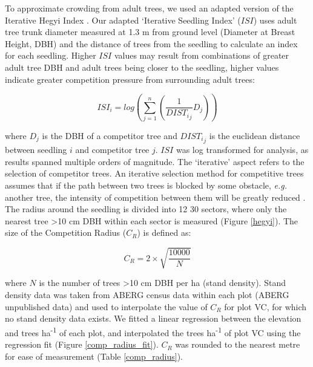 \documentclass[a4paper, 11pt]{article}
\newcommand{\textapprox}{\raisebox{0.5ex}{\texttildelow}}
\begin{document}
To approximate crowding from adult trees, we used an adapted version of the Iterative Hegyi Index \citep{Hegyi1974, Lee2004, Seifert2014}. Our adapted `Iterative Seedling Index' ($ISI$) uses adult tree trunk diameter measured at \textapprox{}1.3 m from ground level (Diameter at Breast Height, DBH) and the distance of trees from the seedling to calculate an index for each seedling. Higher $ISI$ values may result from combinations of  greater adult tree DBH and adult trees being closer to the seedling, higher values indicate greater competition pressure from surrounding adult trees:

\begin{equation}
\label{eq:ISI}
ISI_i = log(\sum_{j=1}^n (\frac{1}{{DIST_i}_j} D_j))
\end{equation}

where $D_j$ is the DBH of a competitor tree and ${{DIST_i}_j}$ is the euclidean distance between seedling $i$ and competitor tree $j$. $ISI$ was log transformed for analysis, as results spanned multiple orders of magnitude. The `iterative' aspect refers to the selection of competitor trees. An iterative selection method for competitive trees assumes that if the path between two trees is blocked by some obstacle, \textit{e.g.} another tree, the intensity of competition between them will be greatly reduced \citep{Gadow1999}. The radius around the seedling is divided into 12 30\textdegree{} sectors, where only the nearest tree \textgreater{}10 cm DBH within each sector is measured (Figure \ref{hegyi}). The size of the Competition Radius ($C_R$) is defined as:

\begin{equation}
\label{eq:CR}
C_R = 2 \times \sqrt{\frac{10000}{N}}
\end{equation}

where $N$ is the number of trees \textgreater10 cm DBH per ha (stand density). Stand density data was taken from ABERG census data within each plot (ABERG unpublished data) and used to interpolate the value of $C_R$ for plot VC, for which no stand density data exists. We fitted a linear regression between the elevation and trees ha\textsuperscript{-1} of each plot, and interpolated the trees ha\textsuperscript{-1} of plot VC using the regression fit (Figure \ref{comp_radius_fit}). $C_R$ was rounded to the nearest metre for ease of measurement (Table \ref{comp_radius}). 
\end{document}
